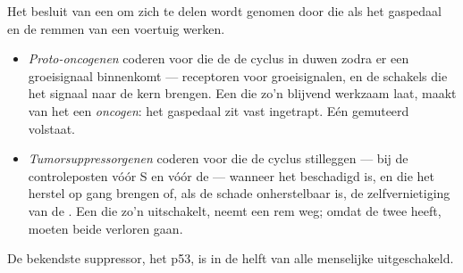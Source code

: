 \begin{proposition}\label{prop:g11:cancer:genes}
Het besluit van een  om zich te delen wordt genomen door  die
als het gaspedaal en de remmen van een voertuig werken.
\begin{itemize}
  \item \emph{Proto-oncogenen} coderen voor
         die de  de cyclus in duwen zodra er een groeisignaal
        binnenkomt --- receptoren voor groeisignalen, en de schakels die
        het signaal naar de kern brengen. Een  die zo'n 
        blijvend werkzaam laat, maakt van het  een
        \emph{oncogen}: het gaspedaal zit vast ingetrapt. Eén gemuteerd
         volstaat.
  \item \emph{Tumorsuppressorgenen} coderen
        voor  die de cyclus stilleggen --- bij de controleposten
        vóór S en vóór de  --- wanneer het  beschadigd is, en
        die het herstel op gang brengen of, als de schade onherstelbaar
        is, de zelfvernietiging van de . Een  die zo'n 
        uitschakelt, neemt een rem weg; omdat de  twee  heeft,
        moeten beide verloren gaan.
\end{itemize}
De bekendste suppressor, het  p53, is in de helft van alle
menselijke  uitgeschakeld.
\end{proposition}
\admitted

